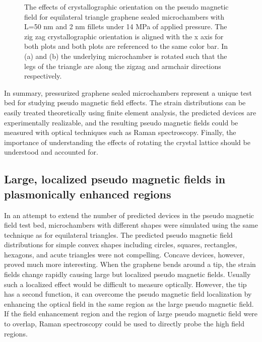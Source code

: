\begin{figure}
  \begin{center}
  
  \end{center}
  \caption[The effects of crystallographic orientation on the pseudo magnetic field]{\label{fig:PVP:Triangle_rot} The effects of crystallographic orientation on the pseudo magnetic field for equilateral triangle graphene sealed microchambers with L=50 nm and 2 nm fillets under 14 MPa of applied pressure. The zig zag crystallographic orientation is aligned with the x axis for both plots and both plots are referenced to the same color bar.  In (a) and (b) the underlying microchamber is rotated such that the legs of the triangle are along the zigzag and armchair directions respectively.}
\end{figure}

In summary, pressurized graphene sealed microchambers represent a unique test bed for studying pseudo magnetic field effects.
The strain distributions can be easily treated theoretically using finite element analysis, the predicted devices are experimentally realizable, and the resulting pseudo magnetic fields could be measured with optical techniques such as Raman spectroscopy.
Finally, the importance of understanding the effects of rotating the crystal lattice should be understood and accounted for.

\subsection{Large, localized pseudo magnetic fields in plasmonically enhanced regions}
In an attempt to extend the number of predicted devices in the pseudo magnetic field test bed, microchambers with different shapes were simulated using the same technique as for equilateral triangles.
The predicted pseudo magnetic field distributions for simple convex shapes including circles, squares, rectangles, hexagons, and acute triangles were not compelling.
Concave devices, however, proved much more interesting.
When the graphene bends around a tip, the strain fields change rapidly causing large but localized pseudo magnetic fields.
Usually such a localized effect would be difficult to measure optically.
However, the tip has a second function, it can overcome the pseudo magnetic field localization by enhancing the optical field in the same region as the large pseudo magnetic field.
If the field enhancement region and the region of large pseudo magnetic field were to overlap, Raman spectroscopy could be used to directly probe the high field regions. 

